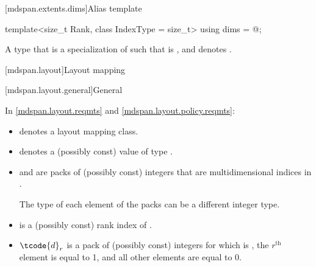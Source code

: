 [mdspan.extents.dims]{Alias template }

%
\begin{itemdecl}
template<size_t Rank, class IndexType = size_t>
  using dims = @\seebelow@;
\end{itemdecl}

\begin{itemdescr}
\pnum
\result
A type  that is a specialization of 
such that  is , and
 denotes .
\end{itemdescr}

[mdspan.layout]{Layout mapping}

[mdspan.layout.general]{General}

\pnum
In \ref{mdspan.layout.reqmts} and \ref{mdspan.layout.policy.reqmts}:

\begin{itemize}
\item
{} denotes a layout mapping class.

\item
{} denotes a (possibly const) value of type .

\item
{} and  are packs of (possibly const) integers
that are multidimensional indices in .
\begin{note}
The type of each element of the packs can be a different integer type.
\end{note}

\item
{} is a (possibly const) rank index of .

\item
$\tcode{d}_r$ is a pack of (possibly const) integers
for which  is ,
the $r^\text{th}$ element is equal to 1, and
all other elements are equal to 0.
\end{itemize}

